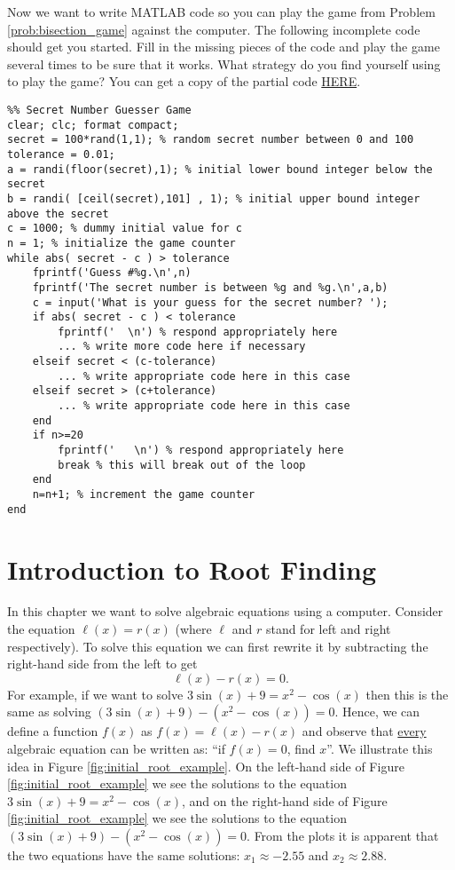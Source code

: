 \begin{problem}
    Now we want to write MATLAB code so you can play the game from Problem
    \ref{prob:bisection_game} against the computer.  The following incomplete code should
    get you started.  Fill in the missing pieces of the code and play the game several
    times to be sure that it works.  What strategy do you find yourself using to play the
    game? You can get a copy of the partial code
    \href{https://drive.google.com/file/d/1QFeb6ZGMppKtV-03_cbUzwaaKM8N39t2/view?usp=sharing}{HERE}.
\begin{lstlisting}
%% Secret Number Guesser Game
clear; clc; format compact;
secret = 100*rand(1,1); % random secret number between 0 and 100
tolerance = 0.01;
a = randi(floor(secret),1); % initial lower bound integer below the secret
b = randi( [ceil(secret),101] , 1); % initial upper bound integer above the secret
c = 1000; % dummy initial value for c
n = 1; % initialize the game counter
while abs( secret - c ) > tolerance
    fprintf('Guess #%g.\n',n)
    fprintf('The secret number is between %g and %g.\n',a,b)
    c = input('What is your guess for the secret number? ');
    if abs( secret - c ) < tolerance
        fprintf('  \n') % respond appropriately here
        ... % write more code here if necessary
    elseif secret < (c-tolerance)
        ... % write appropriate code here in this case
    elseif secret > (c+tolerance)
        ... % write appropriate code here in this case
    end
    if n>=20
        fprintf('   \n') % respond appropriately here
        break % this will break out of the loop
    end
    n=n+1; % increment the game counter
end
\end{lstlisting}
\end{problem}



\newpage
\section{Introduction to Root Finding}
In this chapter we want to solve algebraic equations using a computer.  Consider the equation
$\ell(x) = r(x)$ (where $\ell$ and $r$ stand for left and right respectively).  To solve
this equation we can first rewrite it by subtracting the right-hand side from the left to
get
\[ \ell(x) - r(x) = 0. \]
For example, if we want to solve $3\sin(x) + 9 = x^2 - \cos(x)$ then this is the same as
solving $(3\sin(x) + 9 ) - (x^2 - \cos(x)) = 0$.  Hence, we can define a function $f(x)$
as $f(x)=\ell(x)-r(x)$
and observe that \underline{every} algebraic equation can be written as: ``if $f(x) = 0$,
find $x$''.  We illustrate this idea in Figure \ref{fig:initial_root_example}.  On the
left-hand side of Figure \ref{fig:initial_root_example} we see the solutions to the
equation $3\sin(x) + 9 = x^2 - \cos(x)$, and on the right-hand side of Figure
\ref{fig:initial_root_example} we see the solutions to the equation $\left( 3\sin(x)+9
\right) - \left( x^2 - \cos(x) \right) = 0$.  From the plots it is apparent that the two
equations have the same solutions: $x_1 \approx -2.55$ and $x_2 \approx 2.88$.

